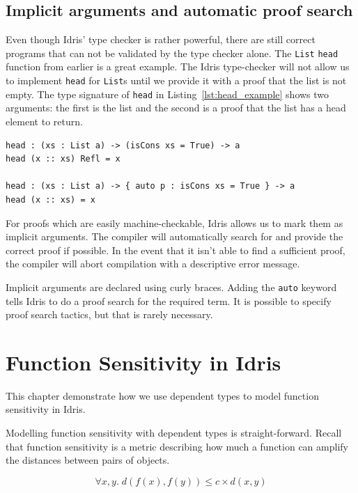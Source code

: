 \documentclass[12pt]{report}
\begin{document}
\section{Implicit arguments and automatic proof search}

Even though Idris' type checker is rather powerful, there are still correct programs that can not be validated by the type checker alone.
The \texttt{List} \lstinline{head} function from earlier is a great example.
The Idris type-checker will not allow us to implement \texttt{head} for \texttt{List}s until we provide it with a proof that the list is not empty.
The type signature of \texttt{head} in Listing~\ref{lst:head_example} shows two arguments: the first is the list and the second is a proof that the list has a head element to return.

\begin{lstlisting}[caption={Taking the head of a list},label={lst:head_example}]
head : (xs : List a) -> (isCons xs = True) -> a
head (x :: xs) Refl = x

head : (xs : List a) -> { auto p : isCons xs = True } -> a
head (x :: xs) = x
\end{lstlisting}

For proofs which are easily machine-checkable, Idris allows us to mark them as implicit arguments.
The compiler will automatically search for and provide the correct proof if possible.
In the event that it isn't able to find a sufficient proof, the compiler will abort compilation with a descriptive error message.

Implicit arguments are declared using curly braces.
Adding the \texttt{auto} keyword tells Idris to do a proof search for the required term.
It is possible to specify proof search tactics, but that is rarely necessary.

\chapter{Function Sensitivity in Idris}\label{sec:function_sensitivity}

This chapter demonstrate how we use dependent types to model function sensitivity in Idris.

Modelling function sensitivity with dependent types is straight-forward.
Recall that function sensitivity is a metric describing how much a function can amplify the distances between pairs of objects.

$$ \forall x,y.\; d(f(x),f(y)) \le c \times d(x,y) $$
\end{document}
